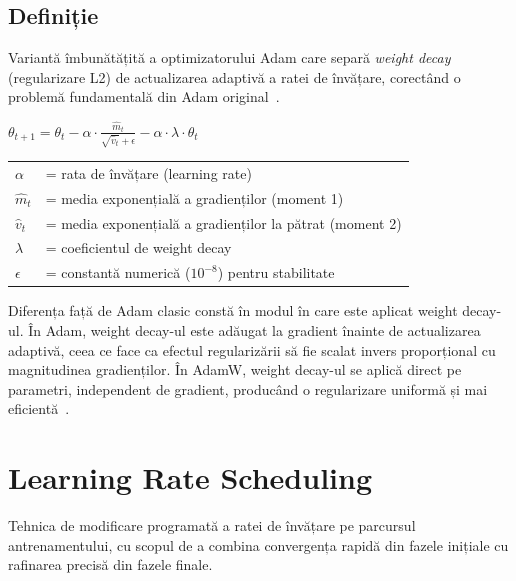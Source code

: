 \documentclass[12pt, a4paper]{report}
\newcommand{\formula}[1]{%
    \begin{center}
        \colorbox{codebackground}{%
            \parbox{0.88\textwidth}{\centering\vspace{4pt}$#1$\vspace{4pt}}%
        }
    \end{center}
}
\begin{document}
\subsection{Definiție}

\vspace{4pt}
\begin{infobox}
Variantă îmbunătățită a optimizatorului Adam care separă
\textit{weight decay} (regularizare L2) de actualizarea adaptivă
a ratei de învățare, corectând o problemă fundamentală din Adam original~\cite{loshchilov2019decoupled}.
\end{infobox}

\formula{
    \theta_{t+1} = \theta_t - \alpha \cdot
    \frac{\hat{m}_t}{\sqrt{\hat{v}_t} + \epsilon}
    - \alpha \cdot \lambda \cdot \theta_t
}

\begin{center}
\begin{tabular}{ll}
    $\alpha$            & = rata de învățare (learning rate) \\
    $\hat{m}_t$         & = media exponențială a gradienților (moment 1) \\
    $\hat{v}_t$         & = media exponențială a gradienților la pătrat (moment 2) \\
    $\lambda$           & = coeficientul de weight decay \\
    $\epsilon$          & = constantă numerică ($10^{-8}$) pentru stabilitate \\
\end{tabular}
\end{center}

Diferența față de Adam clasic constă în modul în care este aplicat weight decay-ul.
În Adam, weight decay-ul este adăugat la gradient înainte de actualizarea adaptivă,
ceea ce face ca efectul regularizării să fie scalat invers proporțional cu magnitudinea
gradienților. În AdamW, weight decay-ul se aplică direct pe parametri, independent de
gradient, producând o regularizare uniformă și mai eficientă~\cite{loshchilov2019decoupled}.


\section{Learning Rate Scheduling}
\label{sec:lr_scheduling}

\vspace{4pt}
\begin{infobox}
Tehnica de modificare programată a ratei de învățare pe parcursul
antrenamentului, cu scopul de a combina convergența rapidă din fazele
inițiale cu rafinarea precisă din fazele finale.
\end{infobox}
\end{document}
